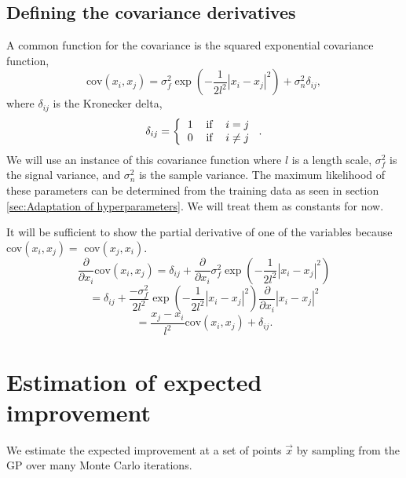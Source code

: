 \documentclass[phd,tocprelim]{cornell}
\begin{document}
\subsection{Defining the covariance derivatives}
\label{methods_GP_cov}

A common function for the covariance is the squared exponential covariance function,
\begin{equation}
    \mbox{cov}(x_{i}, x_{j}) = \sigma_{f}^{2}\exp\left( -\frac{1}{2l^{2}} |x_{i} - x_{j}|^{2}\right)  + \sigma_{n}^{2}\delta_{ij},
\end{equation}
where $\delta_{ij}$ is the Kronecker delta,
\begin{equation}
    \delta_{ij} = \left\{ \begin{tabular}{ccc}
        1 & if & $i=j$ \\
        0 & if & $i\neq j$
    \end{tabular} \right..
\end{equation}
We will use an instance of this covariance function where $l$ is a length scale, $\sigma_{f}^{2}$ is the signal variance, and $\sigma_{n}^{2}$ is the sample variance. The maximum likelihood of these parameters can be determined from the training data as seen in section \ref{sec:Adaptation of hyperparameters}. We will treat them as constants for now.

It will be sufficient to show the partial derivative of one of the variables because cov$(x_{i}, x_{j}) = $ cov$(x_{j}, x_{i})$.
\begin{equation}
    \frac{\partial}{\partial x_{i}} \mbox{cov}(x_{i}, x_{j}) = \delta_{ij} + \frac{\partial}{\partial x_{i}} \sigma_{f}^{2} \exp\left( - \frac{1}{2l^{2}} |x_{i} - x_{j}|^{2}\right)
\end{equation}
\begin{equation}
    =  \delta_{ij} + \frac{-\sigma_{f}^{2}}{2l^{2}} \exp\left( - \frac{1}{2l^{2}} |x_{i} - x_{j}|^{2}\right) \frac{\partial}{\partial x_{i}} |x_{i} - x_{j}|^{2}
\end{equation}
\begin{equation}
    =  \frac{x_{j} - x_{i}}{l^{2}} \mbox{cov}(x_{i}, x_{j}) + \delta_{ij}.
\end{equation}

\section{Estimation of expected improvement}
\label{estEI}

We estimate the expected improvement at a set of points $\vec{x}$ by sampling from the GP over many Monte Carlo iterations.
\end{document}
